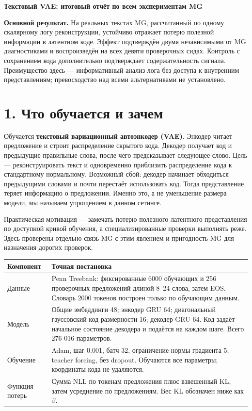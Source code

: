 \documentclass[10pt,a4paper]{article}
\begin{document}
{\Large\bfseries Текстовый VAE: итоговый отчёт по всем экспериментам MG}\par\medskip

\textbf{Основной результат.} На реальных текстах MG, рассчитанный по одному скалярному логу реконструкции, устойчиво отражает потерю полезной информации в латентном коде. Эффект подтверждён двумя независимыми от MG диагностиками и воспроизведён на всех девяти проверочных сидах. Контроль с сохранением кода дополнительно подтверждает содержательность сигнала. Преимущество здесь --- информативный анализ лога без доступа к внутренним представлениям; превосходство над всеми альтернативами не установлено.

\section*{1. Что обучается и зачем}

Обучается \textbf{текстовый вариационный автоэнкодер (VAE)}. Энкодер читает предложение и строит распределение скрытого кода. Декодер получает код и предыдущие правильные слова, после чего предсказывает следующее слово. Цель --- реконструировать текст и одновременно приблизить распределение кода к стандартному нормальному. Возможный сбой: декодер начинает обходиться предыдущими словами и почти перестаёт использовать код. Тогда представление теряет информацию о предложении. Именно это, а не уменьшение размера модели, мы называем упрощением в данном сетинге.

Практическая мотивация --- замечать потерю полезного латентного представления по доступной кривой обучения, а специализированные проверки выполнять реже. Здесь проверены отдельно связь MG с этим явлением и пригодность MG для назначения дорогих проверок.

\begin{center}\small
\begin{tabularx}{\linewidth}{l>{\raggedright\arraybackslash}X}
\toprule
Компонент & Точная постановка \\
\midrule
Данные & Penn Treebank: фиксированные 6000 обучающих и 256 проверочных предложений длиной 8--24 слова, затем EOS. Словарь 2000 токенов построен только по обучающим данным. \\
Модель & Общие эмбеддинги 48; энкодер GRU 64; диагональный гауссовский код размерности 16; декодер GRU 64. Код задаёт начальное состояние декодера и подаётся на каждом шаге. Всего 276 016 параметров. \\
Обучение & Adam, шаг 0.001, батч 32, ограничение нормы градиента 5; teacher forcing, без dropout. Обучаются все параметры; координаты кода не удаляются. \\
Функция потерь & Сумма NLL по токенам предложения плюс взвешенный KL, затем усреднение по предложениям. Вес KL обозначен ниже как $\beta$. \\
\bottomrule\end{tabularx}\end{center}
\end{document}
